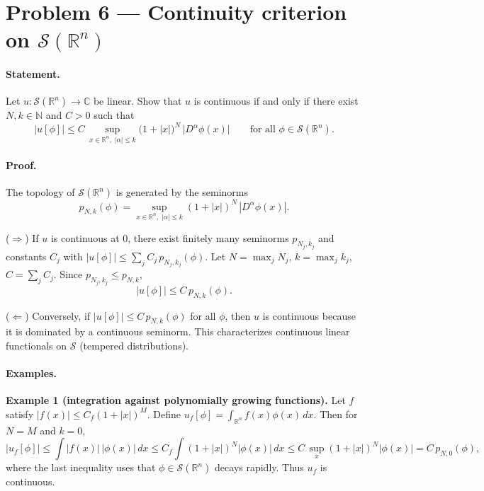 \documentclass[12pt,a4paper]{article}
\theoremstyle{plain}
\theoremstyle{definition}
\theoremstyle{remark}
\theoremstyle{remark}
\begin{document}
\section*{Problem 6 — Continuity criterion on $\mathcal S(\mathbb R^n)$}

\paragraph{Statement.}
Let $u:\mathcal S(\mathbb R^n)\to\mathbb C$ be linear. Show that $u$ is continuous if and only if there exist $N,k\in\mathbb N$ and $C>0$ such that
\[
|u[\phi]|\le C\,\sup_{x\in\mathbb R^n,\;|\alpha|\le k}\bigl(1+|x|\bigr)^N\,\bigl|D^\alpha\phi(x)\bigr|
\qquad\text{for all }\phi\in\mathcal S(\mathbb R^n).
\]

\paragraph{Proof.}

The topology of $\mathcal S(\mathbb R^n)$ is generated by the seminorms
\[
p_{N,k}(\phi)=\sup_{x\in\mathbb R^n,\;|\alpha|\le k} (1+|x|)^N\,|D^\alpha\phi(x)|.
\]

($\Rightarrow$) If $u$ is continuous at $0$, there exist finitely many seminorms $p_{N_j,k_j}$ and constants $C_j$ with
$|u[\phi]|\le \sum_j C_j\,p_{N_j,k_j}(\phi)$. Let $N=\max_j N_j$, $k=\max_j k_j$, $C=\sum_j C_j$. Since $p_{N_j,k_j}\le p_{N,k}$,
\[
|u[\phi]|\le C\,p_{N,k}(\phi).
\]

($\Leftarrow$) Conversely, if $|u[\phi]|\le C\,p_{N,k}(\phi)$ for all $\phi$, then $u$ is continuous because it is dominated by a continuous seminorm. This characterizes continuous linear functionals on $\mathcal S$ (tempered distributions).

\paragraph{Examples.}

\bigskip

\textbf{Example 1 (integration against polynomially growing functions).}
Let $f$ satisfy $|f(x)|\le C_f(1+|x|)^M$. Define $u_f[\phi]=\int_{\mathbb R^n} f(x)\phi(x)\,dx$.
Then for $N=M$ and $k=0$,
\[
|u_f[\phi]|
\le \int |f(x)|\,|\phi(x)|\,dx
\le C_f \int (1+|x|)^N |\phi(x)|\,dx
\le C\, \sup_{x} (1+|x|)^N |\phi(x)|
= C\,p_{N,0}(\phi),
\]
where the last inequality uses that $\phi\in\mathcal S(\mathbb R^n)$ decays rapidly. Thus $u_f$ is continuous.
\end{document}
